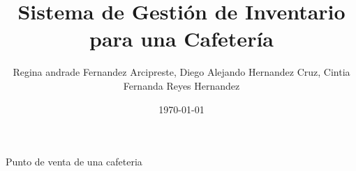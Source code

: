 \documentclass{report}
\title{Sistema de Gestión de Inventario para una Cafetería}
\author{Regina andrade Fern\´andez Arcipreste, Diego Alejando Hern\´andez Cruz, Cintia Fernanda Reyes Hern\´andez  }
\date{\today}
\begin{document}
\begin{center}
Punto de venta de una cafeter\´ia
\end{center}
\end{document}
